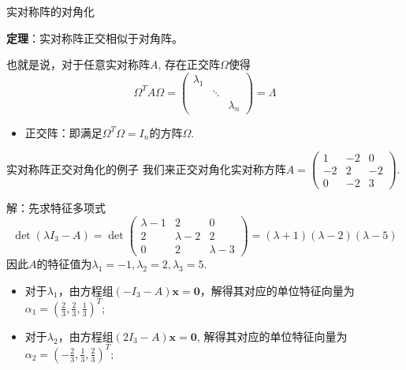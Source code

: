 
\begin{frame}

\begin{block}{实对称阵的对角化}

\vspace{1em}

{\bfseries 定理}：实对称阵正交相似于对角阵。

\vspace{1em}

也就是说，对于任意实对称阵$A$, 存在正交阵$\Omega$使得
\[\Omega^T A \Omega = \begin{pmatrix} \lambda_1 & & \\ & \ddots & \\ & & \lambda_n \end{pmatrix} = \Lambda\]

\begin{itemize}
\item 正交阵：即满足$\Omega^T\Omega = I_n$的方阵$\Omega$.
\end{itemize}
\end{block}

\end{frame}


\begin{frame}

\begin{block}{实对称阵正交对角化的例子}
我们来正交对角化实对称方阵$A = \begin{pmatrix} 1 & -2 & 0 \\ -2 & 2 & -2 \\ 0 & -2 & 3 \end{pmatrix}.$

\vspace{1em}
\pause

解：先求特征多项式
\begin{equation*}
\det(\lambda I_3 - A) = \det \begin{pmatrix} \lambda-1 & 2 & 0 \\ 2 & \lambda-2 & 2 \\ 0 & 2 & \lambda-3\end{pmatrix} =(\lambda+1)(\lambda-2)(\lambda-5)
\end{equation*}
因此$A$的特征值为$\lambda_1=-1,\lambda_2=2,\lambda_3=5$.

\begin{itemize}
\item 对于$\lambda_1$，由方程组$(-I_3-A) \mathbf{x} = \mathbf{0}$，解得其对应的单位特征向量为$\alpha_1 = (\frac{2}{3},\frac{2}{3},\frac{1}{3})^T$;
\item 对于$\lambda_2$，由方程组$(2I_3-A) \mathbf{x} = \mathbf{0}$, 解得其对应的单位特征向量为$\alpha_2 = (-\frac{2}{3}, \frac{1}{3}, \frac{2}{3})^T$;
\end{itemize}
\end{block}

\end{frame}

